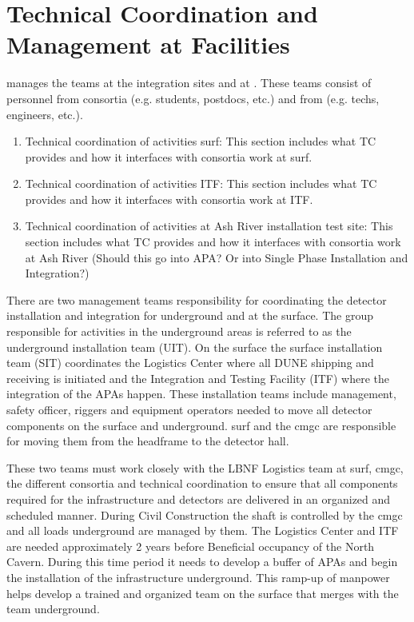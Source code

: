\chapter{Technical Coordination and Management at Facilities}
\label{vl:tc-facility_mgmt}

  manages the teams at the integration sites and
at \surf. These teams consist of personnel from consortia
(e.g. students, postdocs, etc.) and from  (e.g. techs,
engineers, etc.).
\begin{enumerate}
 \item Technical coordination of activities {surf}: This section
   includes what TC provides and how it interfaces with consortia work
   at {surf}.
 \item Technical coordination of activities ITF: This section includes
   what TC provides and how it interfaces with consortia work at ITF.
 \item Technical coordination of activities at Ash River installation
   test site: This section includes what TC provides and how it
   interfaces with consortia work at Ash River (Should this go into
   APA? Or into Single Phase Installation and Integration?)
\end{enumerate}



There are two management teams responsibility for coordinating the
detector installation and integration for underground and at the
surface. The group responsible for activities in the underground areas
is referred to as the underground installation team (UIT).  On the
surface the surface installation team (SIT) coordinates the Logistics
Center where all DUNE shipping and receiving is initiated and the
Integration and Testing Facility (ITF) where the integration of the
APAs happen.  These installation teams include management, safety
officer, riggers and equipment operators needed to move all detector
components on the surface and underground. {surf} and the {cmgc} are
responsible for moving them from the headframe to the detector hall.

These two teams must work closely with the LBNF Logistics team at
{surf}, {cmgc}, the different consortia and technical coordination to
ensure that all components required for the infrastructure and
detectors are delivered in an organized and scheduled manner. During
Civil Construction the shaft is controlled by the {cmgc} and all loads
underground are managed by them.  The Logistics Center and ITF are
needed approximately 2 years before Beneficial occupancy of the North
Cavern.  During this time period it needs to develop a buffer of APAs
and begin the installation of the infrastructure underground. This
ramp-up of manpower helps develop a trained and organized team on the
surface that merges with the team underground.


